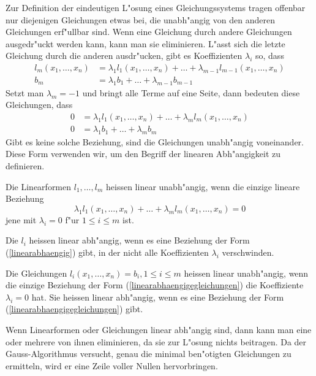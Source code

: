 Zur Definition der eindeutigen L"osung eines Gleichungssystems 
tragen offenbar nur diejenigen Gleichungen etwas bei, die unabh"angig
von den anderen Gleichungen erf"ullbar sind.
Wenn eine Gleichung
durch andere Gleichungen ausgedr"uckt werden kann, kann man sie
eliminieren.
L"asst sich die letzte Gleichung durch die
anderen ausdr"ucken, gibt es Koeffizienten $\lambda_i$ so, dass
\begin{equation*}
\begin{aligned}
l_m(x_1,\dots,x_n)&=\lambda_1 l_1(x_1,\dots,x_n)+\dots+\lambda_{m-1}l_{m-1}(x_1,\dots, x_n)\\
b_m&=\lambda_1b_1+\dots+\lambda_{m-1}b_{m-1}
\end{aligned}
\end{equation*}
Setzt man $\lambda_m=-1$ und bringt alle Terme auf eine Seite,
dann bedeuten diese Gleichungen, dass
\begin{equation}
\begin{aligned}
0&=\lambda_1l_1(x_1,\dots,x_n)+\dots+\lambda_ml_m(x_1,\dots,x_n)\\
0&=\lambda_1b_1+\dots+\lambda_mb_m
\end{aligned}
\label{linearabhaengigegleichungen}
\end{equation}
Gibt es keine solche Beziehung, sind die Gleichungen unabh"angig
voneinander.
Diese Form verwenden wir, um den Begriff der linearen Abh"angigkeit
zu definieren.
\begin{definition}
Die Linearformen $l_1,\dots,l_m$ heissen linear unabh"angig,
wenn die einzige lineare Beziehung
\begin{equation}
\lambda_1l_1(x_1,\dots,x_n)+\dots+\lambda_ml_m(x_1,\dots,x_n)=0
\label{linearabhaengig}
\end{equation}
jene mit $\lambda_i=0$ f"ur $1\le i\le m$ ist.

Die $l_i$ heissen linear abh"angig, wenn es eine Beziehung der Form
(\ref{linearabhaengig})
gibt, in der nicht alle Koeffizienten $\lambda_i$ verschwinden.

Die Gleichungen $l_i(x_1,\dots,x_n)=b_i,1\le i\le m$ heissen linear unabh"angig,
wenn  die einzige Beziehung der Form (\ref{linearabhaengigegleichungen})
die Koeffiziente $\lambda_i=0$ hat.
Sie heissen linear abh"angig, wenn
es eine Beziehung der Form (\ref{linearabhaengigegleichungen}) gibt.
\end{definition}

Wenn Linearformen oder Gleichungen linear abh"angig sind, dann kann
man eine oder mehrere von ihnen eliminieren, da sie zur L"osung nichts
beitragen.
Da der Gauss-Algorithmus versucht, genau die minimal ben"otigten Gleichungen
zu ermitteln, wird er eine Zeile voller Nullen hervorbringen.

